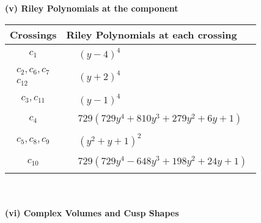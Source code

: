 \documentclass[1p]{elsarticle_modified}
\theoremstyle{definition}
\begin{document}
\newpage\renewcommand{\arraystretch}{1}
\flushleft \textbf{(v) Riley Polynomials at the component}\newline \\
\begin{tabular}{m{50pt}|m{274pt}}
Crossings & \hspace{64pt}Riley Polynomials at each crossing \\
\hline $$\begin{aligned}c_{1}\end{aligned}$$&$\begin{aligned}
&(y-4)^4
\end{aligned}$\\
\hline $$\begin{aligned}c_{2},c_{6},c_{7}\\c_{12}\end{aligned}$$&$\begin{aligned}
&(y+2)^4
\end{aligned}$\\
\hline $$\begin{aligned}c_{3},c_{11}\end{aligned}$$&$\begin{aligned}
&(y-1)^4
\end{aligned}$\\
\hline $$\begin{aligned}c_{4}\end{aligned}$$&$\begin{aligned}
&729(729 y^4+810 y^3+279 y^2+6 y+1)
\end{aligned}$\\
\hline $$\begin{aligned}c_{5},c_{8},c_{9}\end{aligned}$$&$\begin{aligned}
&(y^2+y+1)^2
\end{aligned}$\\
\hline $$\begin{aligned}c_{10}\end{aligned}$$&$\begin{aligned}
&729(729 y^4-648 y^3+198 y^2+24 y+1)
\end{aligned}$\\
\hline
\end{tabular}\\~\\
\newpage\flushleft \textbf{(vi) Complex Volumes and Cusp Shapes}
\end{document}
